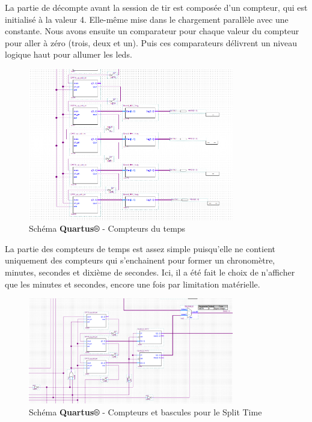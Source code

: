 \documentclass{rapport}
\begin{document}
La partie de décompte avant la session de tir est composée d'un compteur, qui est initialisé à la valeur 4. Elle-même mise dans le chargement parallèle avec une constante. Nous avons ensuite un comparateur pour chaque valeur du compteur pour aller à zéro (trois, deux et un). Puis ces comparateurs délivrent un niveau logique haut pour allumer les leds.
\newpage

\begin{figure}[h!]

    \centering

    \includegraphics[width=0.8\textwidth]{src/time_part.png}

    \caption{Schéma \textbf{Quartus®} - Compteurs du temps}

    \label{fig:functional_diagram}

\end{figure}

La partie des compteurs de temps est assez simple puisqu'elle ne contient uniquement des compteurs qui s'enchainent pour former un chronomètre, minutes, secondes et dixième de secondes. Ici, il a été fait le choix de n'afficher que les minutes et secondes, encore une fois par limitation matérielle.

\begin{figure}[h!]

    \centering

    \includegraphics[width=0.8\textwidth]{src/split_time_part.png}

    \caption{Schéma \textbf{Quartus®} - Compteurs et bascules pour le Split Time}

    \label{fig:functional_diagram}

\end{figure}
\end{document}
